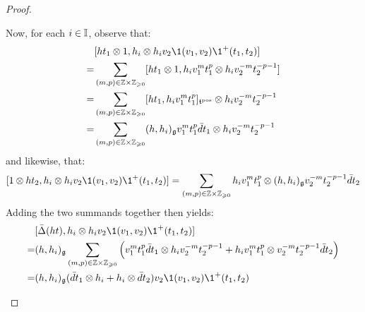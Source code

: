 \begin{proof}
\begin{enumerate}
\begin{enumerate}
                        Now, for each $i \in \mathbb{I}$, observe that:
                            $$
                                \begin{aligned}
                                    & [h t_1 \tensor 1, h_i \tensor h_i v_2\1(v_1, v_2) \1^+(t_1, t_2)]
                                    \\
                                    = & \sum_{(m, p) \in \Z \x \Z_{\geq 0}} [ht_1 \tensor 1, h_i v_1^m t_1^p \tensor h_i v_2^{-m} t_2^{-p - 1}]
                                    \\
                                    = & \sum_{(m, p) \in \Z \x \Z_{\geq 0}} [ht_1, h_i v_1^m t_1^p]_{\toroidal^{\positive}} \tensor h_i v_2^{-m} t_2^{-p - 1}
                                    \\
                                    = & \sum_{(m, p) \in \Z \x \Z_{\geq 0}} (h, h_i)_{\g} v_1^m t_1^p \bar{d}t_1 \tensor h_i v_2^{-m} t_2^{-p - 1}
                                \end{aligned}
                            $$
                        and likewise, that:
                            $$[1 \tensor h t_2, h_i \tensor h_i v_2\1(v_1, v_2) \1^+(t_1, t_2)] = \sum_{(m, p) \in \Z \x \Z_{\geq 0}} h_i v_1^m t_1^p \tensor (h, h_i)_{\g} v_2^{-m} t_2^{-p - 1} \bar{d}t_2$$
                        Adding the two summands together then yields:
                            $$
                                \begin{aligned}
                                    & [\bar{\Delta}(ht), h_i \tensor h_i v_2\1(v_1, v_2) \1^+(t_1, t_2)]
                                    \\
                                    = & (h, h_i)_{\g} \sum_{(m, p) \in \Z \x \Z_{\geq 0}} \left( v_1^m t_1^p \bar{d}t_1 \tensor h_i v_2^{-m} t_2^{-p - 1} + h_i v_1^m t_1^p \tensor v_2^{-m} t_2^{-p - 1} \bar{d}t_2 \right)
                                    \\
                                    = & (h, h_i)_{\g} ( \bar{d}t_1 \tensor h_i + h_i \tensor \bar{d}t_2 ) v_2\1(v_1, v_2) \1^+(t_1, t_2)
                                \end{aligned}
                            $$
                        

\end{enumerate}
\end{enumerate}
\end{proof}
